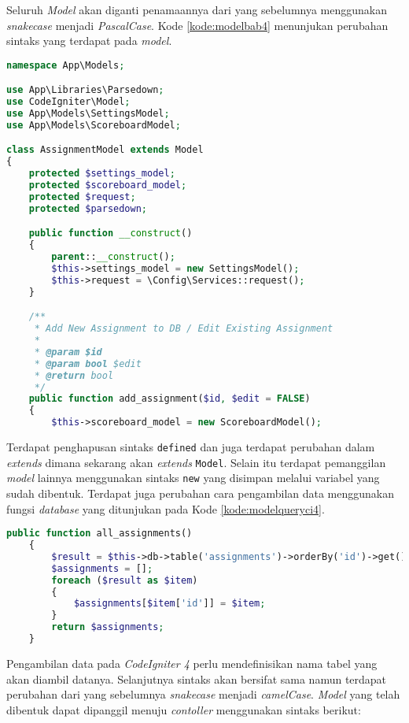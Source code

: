 Seluruh \textit{Model} akan diganti penamaannya dari yang sebelumnya menggunakan \textit{snakecase} menjadi \textit{PascalCase}. Kode \ref{kode:modelbab4} menunjukan perubahan sintaks yang terdapat pada \textit{model}.

\begin{lstlisting}[language=PHP, caption=Perancangan perubahan \textit{model} pada \textit{CodeIgniter 4}, label=kode:modelbab4]
namespace App\Models;

use App\Libraries\Parsedown;
use CodeIgniter\Model;
use App\Models\SettingsModel;
use App\Models\ScoreboardModel;

class AssignmentModel extends Model
{
	protected $settings_model;
	protected $scoreboard_model;
	protected $request;
	protected $parsedown;

	public function __construct()
	{
		parent::__construct();
		$this->settings_model = new SettingsModel();
		$this->request = \Config\Services::request(); 
	}

	/**
	 * Add New Assignment to DB / Edit Existing Assignment
	 *
	 * @param $id
	 * @param bool $edit
	 * @return bool
	 */
	public function add_assignment($id, $edit = FALSE)
	{	
		$this->scoreboard_model = new ScoreboardModel();
\end{lstlisting}

Terdapat penghapusan sintaks \texttt{defined} dan juga terdapat perubahan dalam \textit{extends} dimana sekarang akan \textit{extends} \texttt{Model}. Selain itu terdapat pemanggilan \textit{model} lainnya menggunakan sintaks \texttt{new} yang disimpan melalui variabel yang sudah dibentuk. Terdapat juga perubahan cara pengambilan data menggunakan fungsi \textit{database} yang ditunjukan pada Kode \ref{kode:modelqueryci4}.

\begin{lstlisting}[language=PHP, caption=Perubahan sintaks pada \textit{model}, label=kode:modelqueryci4]
	public function all_assignments()
	{
		$result = $this->db->table('assignments')->orderBy('id')->get()->getResultArray();
		$assignments = [];
		foreach ($result as $item)
		{
			$assignments[$item['id']] = $item;
		}
		return $assignments;
	}
\end{lstlisting}

Pengambilan data pada \textit{CodeIgniter 4} perlu mendefinisikan nama tabel yang akan diambil datanya. Selanjutnya sintaks akan bersifat sama namun terdapat perubahan dari yang sebelumnya \textit{snakecase} menjadi \textit{camelCase}. \textit{Model} yang telah dibentuk dapat dipanggil menuju \textit{contoller} menggunakan sintaks berikut:

